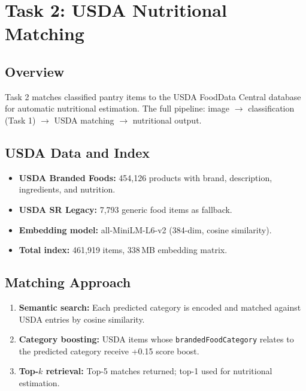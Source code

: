 \documentclass[11pt]{article}
\begin{document}
\section{Task 2: USDA Nutritional Matching}
\label{sec:task2}

\subsection{Overview}

Task 2 matches classified pantry items to the USDA FoodData Central database for automatic nutritional estimation. The full pipeline: image $\rightarrow$ classification (Task 1) $\rightarrow$ USDA matching $\rightarrow$ nutritional output.

\subsection{USDA Data and Index}

\begin{itemize}[nosep,leftmargin=1.5em]
  \item \textbf{USDA Branded Foods:} 454,126 products with brand, description, ingredients, and nutrition.
  \item \textbf{USDA SR Legacy:} 7,793 generic food items as fallback.
  \item \textbf{Embedding model:} all-MiniLM-L6-v2 (384-dim, cosine similarity).
  \item \textbf{Total index:} 461,919 items, 338\,MB embedding matrix.
\end{itemize}

\subsection{Matching Approach}

\begin{enumerate}[nosep,leftmargin=1.5em]
  \item \textbf{Semantic search:} Each predicted category is encoded and matched against USDA entries by cosine similarity.
  \item \textbf{Category boosting:} USDA items whose \texttt{brandedFoodCategory} relates to the predicted category receive +0.15 score boost.
  \item \textbf{Top-$k$ retrieval:} Top-5 matches returned; top-1 used for nutritional estimation.
\end{enumerate}
\end{document}

